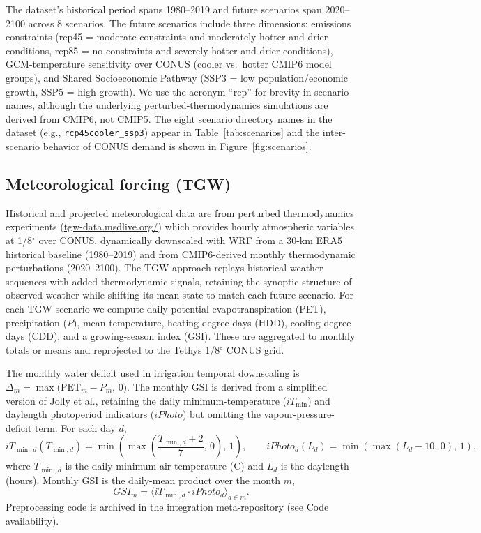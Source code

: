 \documentclass[fleqn,10pt]{wlscirep}
\begin{document}
The dataset's historical period spans 1980--2019 and future scenarios span 2020--2100 across 8 scenarios\cite{Zhao_gcamusa_water,Zhao2024,Mongird2025CERF}. The future scenarios include three dimensions: emissions constraints (rcp45 = moderate constraints and moderately hotter and drier conditions, rcp85 = no constraints and severely hotter and drier conditions), GCM-temperature sensitivity over CONUS (cooler vs.\ hotter CMIP6 model groups), and Shared Socioeconomic Pathway (SSP3 = low population/economic growth, SSP5 = high growth). We use the acronym ``rcp'' for brevity in scenario names, although the underlying perturbed-thermodynamics simulations are derived from CMIP6, not CMIP5\cite{Mongird2025CERF}. The eight scenario directory names in the dataset (e.g., \texttt{rcp45cooler\_ssp3}) appear in Table~\ref{tab:scenarios} and the inter-scenario behavior of CONUS demand is shown in Figure~\ref{fig:scenarios}.

\subsection*{Meteorological forcing (TGW)}

Historical and projected meteorological data are from perturbed thermodynamics experiments \cite{Jones2023TGW} (\href{https://tgw-data.msdlive.org/}{tgw-data.msdlive.org/}) which provides hourly atmospheric variables at 1/8$^{\circ}$ over CONUS, dynamically downscaled with WRF from a 30-km ERA5 historical baseline (1980--2019) and from CMIP6-derived monthly thermodynamic perturbations (2020--2100). The TGW approach replays historical weather sequences with added thermodynamic signals, retaining the synoptic structure of observed weather while shifting its mean state to match each future scenario. For each TGW scenario we compute daily potential evapotranspiration (PET), precipitation ($P$), mean temperature, heating degree days (HDD), cooling degree days (CDD), and a growing-season index (GSI). These are aggregated to monthly totals or means and reprojected to the Tethys 1/8$^{\circ}$ CONUS grid.

The monthly water deficit used in irrigation temporal downscaling is $\Delta_m = \max\!\big(\text{PET}_m - P_m,\, 0\big)$. The monthly GSI is derived from a simplified version of Jolly et al.\cite{Jolly_2005}, retaining the daily minimum-temperature ($iT_{\min}$) and daylength photoperiod indicators ($iPhoto$) but omitting the vapour-pressure-deficit term. For each day $d$,
\begin{equation}
iT_{\min,d}(T_{\min,d}) = \min\!\left(\max\!\left(\frac{T_{\min,d}+2}{7},\,0\right),\,1\right), \qquad
iPhoto_d(L_d) = \min\!\left(\max\!\left(L_d - 10,\,0\right),\,1\right),
\label{eq:gsi-components}
\end{equation}
where $T_{\min,d}$ is the daily minimum air temperature (\textdegree C) and $L_d$ is the daylength (hours). Monthly GSI is the daily-mean product over the month $m$,
\begin{equation}
GSI_m = \big\langle iT_{\min,d} \cdot iPhoto_d \big\rangle_{d \in m}.
\label{eq:gsi-monthly}
\end{equation}
Preprocessing code is archived in the integration meta-repository (see Code availability).
\end{document}
